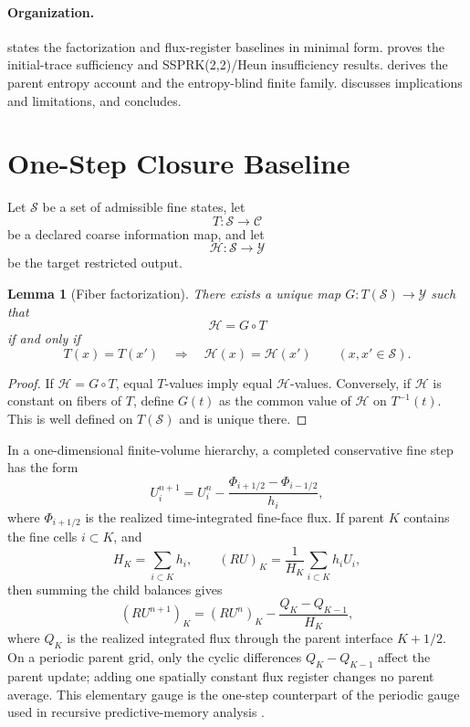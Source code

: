 \documentclass[a4paper,fleqn, sort&compress]{cas-sc}
\newtheorem{lemma}[theorem]{Lemma}
\theoremstyle{remark}
\theoremstyle{definition}
\begin{document}
\paragraph{Organization.}
 states the factorization and flux-register baselines in
minimal form.   proves the initial-trace sufficiency and
SSPRK(2,2)/Heun insufficiency results.   derives the
parent entropy account and the entropy-blind finite family.
 discusses implications and limitations, and
 concludes.

\section{One-Step Closure Baseline}
\label{sec:baseline}

Let \(\mathcal S\) be a set of admissible fine states, let
\[
  T:\mathcal S\to\mathcal C
\]
be a declared coarse information map, and let
\[
  \mathcal H:\mathcal S\to\mathcal Y
\]
be the target restricted output.

\begin{lemma}[Fiber factorization]
\label{lem:factorization}
There exists a unique map \(G:T(\mathcal S)\to\mathcal Y\) such that
\[
  \mathcal H=G\circ T
\]
if and only if
\[
  T(x)=T(x')\quad\Longrightarrow\quad \mathcal H(x)=\mathcal H(x')
  \qquad (x,x'\in\mathcal S).
\]
\end{lemma}

\begin{proof}
If \(\mathcal H=G\circ T\), equal \(T\)-values imply equal
\(\mathcal H\)-values.  Conversely, if \(\mathcal H\) is constant on fibers
of \(T\), define \(G(t)\) as the common value of \(\mathcal H\) on
\(T^{-1}(t)\).  This is well defined on \(T(\mathcal S)\) and is unique
there.
\end{proof}

In a one-dimensional finite-volume hierarchy, a completed conservative fine
step has the form
\[
  U_i^{n+1}
  =
  U_i^n
  -
  \frac{\Phi_{i+1/2}-\Phi_{i-1/2}}{h_i},
\]
where \(\Phi_{i+1/2}\) is the realized time-integrated fine-face flux.  If
parent \(K\) contains the fine cells \(i\subset K\), and
\[
  H_K=\sum_{i\subset K}h_i,
  \qquad
  (RU)_K=\frac1{H_K}\sum_{i\subset K}h_iU_i,
\]
then summing the child balances gives
\begin{equation}
  (RU^{n+1})_K
  =
  (RU^n)_K
  -
  \frac{Q_K-Q_{K-1}}{H_K},
  \label{eq:flux-register-update}
\end{equation}
where \(Q_K\) is the realized integrated flux through the parent interface
\(K+1/2\).  On a periodic parent grid, only the cyclic differences
\(Q_K-Q_{K-1}\) affect the parent update; adding one spatially constant flux
register changes no parent average.  This elementary gauge is the one-step
counterpart of the periodic gauge used in recursive predictive-memory
analysis \cite{PolemitisChristakisDrikakis2026FVerasure}.
\end{document}
